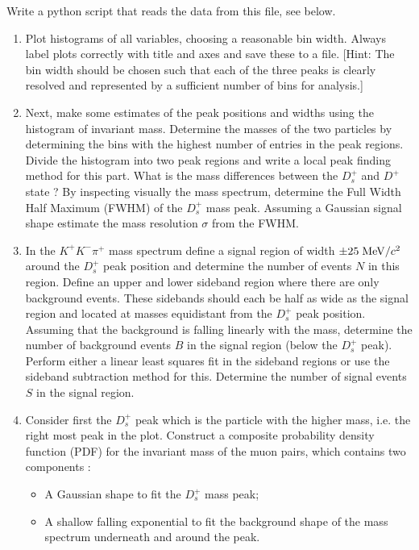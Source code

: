 Write a python script that reads the data from this file, see below. 


\begin{enumerate}

\item Plot histograms of all variables, choosing a reasonable bin width. Always label plots correctly with title and axes and save these to a file. [Hint: The bin width should be chosen such that each of the three peaks is clearly resolved and represented by a sufficient number of bins for analysis.]

\item Next, make some estimates of the peak positions and widths using the histogram of invariant mass.  Determine the masses of the two particles by determining the bins with the highest number of entries in the peak regions. Divide the histogram into two peak regions and write a local peak finding method for this part. What is the mass differences between the $D_s^+$ and $D^+$ state ? By inspecting visually the mass spectrum, determine the Full Width Half Maximum (FWHM) of the $D_s^+$ mass peak. Assuming a Gaussian signal shape estimate the mass resolution $\sigma$ from the FWHM.

\item In the  $K^{+}K^{-}\pi^{+}$  mass spectrum define a signal region of width $\pm 25\; {\rm MeV}/c^2$ around the $D_s^+$  peak position and determine the number of events $N$ in this region.
Define an upper and lower sideband region where there are only background events. These sidebands should each be half as wide as the signal region and located at masses equidistant from the $D_s^+$  peak position. Assuming that the background is falling linearly with the mass, determine the number of background events $B$ in the signal region (below the $D_s^+$ peak). Perform either a linear least squares fit in the sideband regions or use the sideband subtraction method for this. Determine the number of signal events $S$ in the signal region.

\item Consider first the $D_s^+$ peak which is the particle with the higher
mass, i.e. the right most peak in the plot. Construct a composite probability density
function (PDF) for the invariant mass of the muon pairs, which
contains two components : 
\begin{itemize}
\item A Gaussian shape to fit the  $D_s^+$ mass peak;
\item A shallow falling exponential to fit the background shape of the mass spectrum underneath and around the peak.
\end{itemize}


\end{enumerate}
